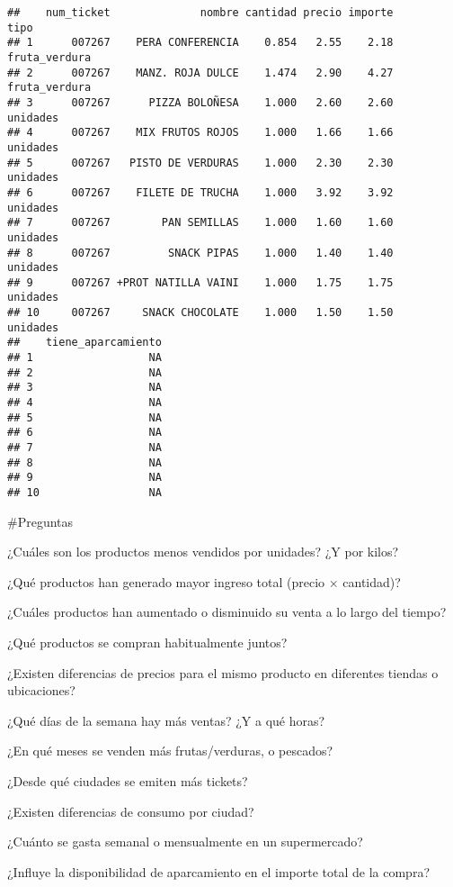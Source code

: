\documentclass[,,,oneauthor,pdftex]{Definitions/mdpi}
\begin{document}
\begin{verbatim}
##    num_ticket              nombre cantidad precio importe          tipo
## 1      007267    PERA CONFERENCIA    0.854   2.55    2.18 fruta_verdura
## 2      007267    MANZ. ROJA DULCE    1.474   2.90    4.27 fruta_verdura
## 3      007267      PIZZA BOLOÑESA    1.000   2.60    2.60      unidades
## 4      007267    MIX FRUTOS ROJOS    1.000   1.66    1.66      unidades
## 5      007267   PISTO DE VERDURAS    1.000   2.30    2.30      unidades
## 6      007267    FILETE DE TRUCHA    1.000   3.92    3.92      unidades
## 7      007267        PAN SEMILLAS    1.000   1.60    1.60      unidades
## 8      007267         SNACK PIPAS    1.000   1.40    1.40      unidades
## 9      007267 +PROT NATILLA VAINI    1.000   1.75    1.75      unidades
## 10     007267     SNACK CHOCOLATE    1.000   1.50    1.50      unidades
##    tiene_aparcamiento
## 1                  NA
## 2                  NA
## 3                  NA
## 4                  NA
## 5                  NA
## 6                  NA
## 7                  NA
## 8                  NA
## 9                  NA
## 10                 NA
\end{verbatim}

\#Preguntas

¿Cuáles son los productos menos vendidos por unidades? ¿Y por kilos?

¿Qué productos han generado mayor ingreso total (precio × cantidad)?

¿Cuáles productos han aumentado o disminuido su venta a lo largo del
tiempo?

¿Qué productos se compran habitualmente juntos?

¿Existen diferencias de precios para el mismo producto en diferentes
tiendas o ubicaciones?

¿Qué días de la semana hay más ventas? ¿Y a qué horas?

¿En qué meses se venden más frutas/verduras, o pescados?

¿Desde qué ciudades se emiten más tickets?

¿Existen diferencias de consumo por ciudad?

¿Cuánto se gasta semanal o mensualmente en un supermercado?

¿Influye la disponibilidad de aparcamiento en el importe total de la
compra?


\vspace{6pt}
\end{document}
